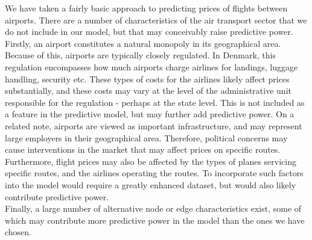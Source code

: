 We have taken a fairly basic approach to predicting prices of flights between airports. There are a number of characteristics of the air transport sector that we do not include in our model, but that may conceivably raise predictive power. 
Firstly, an airport constitutes a natural monopoly in its geographical area. Because of this, airports are typically closely regulated. In Denmark, this regulation encompasses how much airports charge airlines for landings, luggage handling, security etc. These types of costs for the airlines likely affect prices substantially, and these costs may vary at the level of the administrative unit responsible for the regulation - perhaps at the state level. This is not included as a feature in the predictive model, but may further add predictive power. On a related note, airports are viewed as important infrastructure, and may represent large employers in their geographical area. Therefore, political concerns may cause interventions in the market that may affect prices on specific routes. Furthermore, flight prices may also be affected by the types of planes servicing specific routes, and the airlines operating the routes. To incorporate such factors into the model would require a greatly enhanced dataset, but would also likely contribute predictive power. \\
Finally, a large number of alternative node or edge characteristics exist, some of which may contribute more predictive power in the model than the ones we have chosen. 
